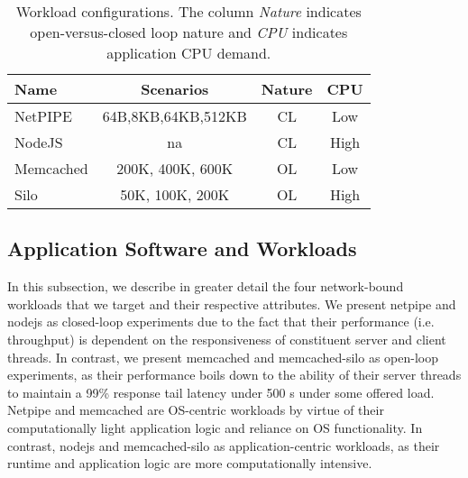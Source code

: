 



\begin{table}[t]
\centering
\begin{tabular}{l|c|c|c}
  Name & Scenarios & Nature & CPU\\
  \hline
  NetPIPE & {\small 64B,8KB,64KB,512KB} & CL & Low\\ \hline
  NodeJS & na & CL & High \\ \hline
  Memcached & 200K, 400K, 600K & OL & Low \\ \hline
  Silo & 50K, 100K, 200K & OL & High \\ 
\end{tabular}
\caption{Workload configurations.
The column {\em Nature} indicates open-versus-closed loop nature
and {\em CPU} indicates application CPU demand.}
\label{table:wrkcfgs}	
\end{table}

\subsection{Application Software and Workloads}
\label{sec:apps}
%
In this subsection, we describe in greater detail the four network-bound workloads that we target and their respective attributes. We present netpipe and nodejs as closed-loop experiments due to the fact that their performance (i.e. throughput) is dependent on the responsiveness of constituent server and client threads. In contrast, we present memcached and memcached-silo as open-loop experiments, as their performance boils down to the ability of their server threads to maintain a 99\% response tail latency under 500 {\micro}s under some offered load. Netpipe and memcached are OS-centric workloads by virtue of their computationally light application logic and reliance on OS functionality. In contrast, nodejs and memcached-silo as application-centric workloads, as their runtime and application logic are more computationally intensive.

